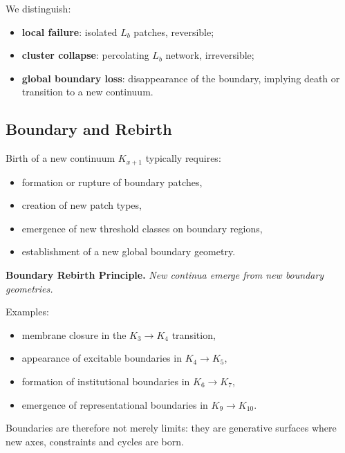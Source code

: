 We distinguish:
\begin{itemize}
    \item \textbf{local failure}: isolated \(L_b\) patches, reversible;
    \item \textbf{cluster collapse}: percolating \(L_b\) network, irreversible;
    \item \textbf{global boundary loss}: disappearance of the boundary, implying
          death or transition to a new continuum.
\end{itemize}

\subsection{Boundary and Rebirth}

Birth of a new continuum \(K_{x+1}\) typically requires:
\begin{itemize}
    \item formation or rupture of boundary patches,
    \item creation of new patch types,
    \item emergence of new threshold classes on boundary regions,
    \item establishment of a new global boundary geometry.
\end{itemize}

\textbf{Boundary Rebirth Principle.}
\emph{New continua emerge from new boundary geometries.}

Examples:
\begin{itemize}
    \item membrane closure in the \(K_3 \to K_4\) transition,
    \item appearance of excitable boundaries in \(K_4 \to K_5\),
    \item formation of institutional boundaries in \(K_6 \to K_7\),
    \item emergence of representational boundaries in \(K_9 \to K_{10}\).
\end{itemize}

Boundaries are therefore not merely limits:
they are generative surfaces where new axes, constraints and cycles are born.
